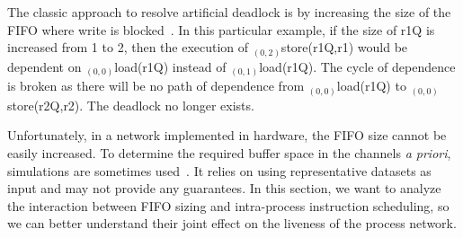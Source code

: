 \documentclass{sig-alternate}
\begin{document}

The classic approach to resolve artificial deadlock is by increasing the size of the FIFO where write is blocked~\cite{parks1995bounded}. 
In this particular example, if the size of r1Q is increased
from 1 to 2, then the execution of $_{(0,2)}$store(r1Q,r1) would be dependent on 
$_{(0,0)}$load(r1Q) instead of $_{(0,1)}$load(r1Q). The cycle of dependence is broken as there will be no path of dependence from $_{(0,0)}$load(r1Q)
to $_{(0,0)}$store(r2Q,r2). The deadlock no longer exists.

Unfortunately, in a network implemented in hardware, the FIFO size cannot be easily increased.
To determine the required buffer space in the channels \textit{a priori}, simulations are sometimes used~\cite{buck1994ptolemy}. It relies 
on using representative datasets as input and%
may not provide any guarantees.%
In this section, we want to analyze the interaction between FIFO
sizing and intra-process instruction scheduling, 
so we can better understand
their joint effect on the liveness of the process network.
\end{document}
